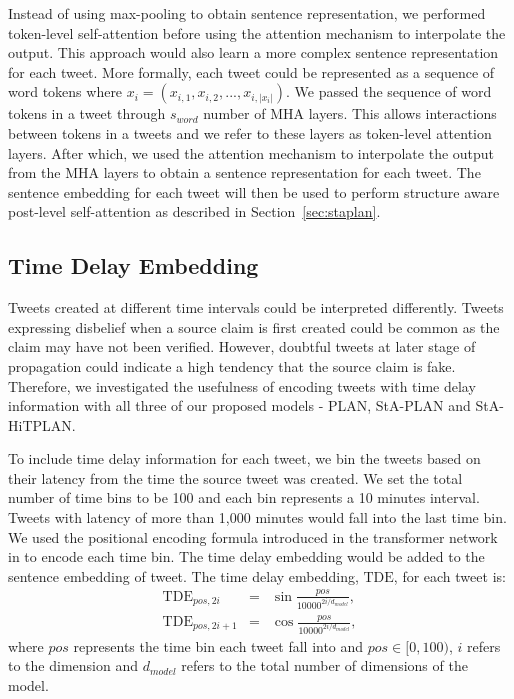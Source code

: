\documentclass[letterpaper]{article} %
\begin{document}
Instead of using max-pooling to obtain sentence representation, we performed token-level self-attention before using the attention mechanism to interpolate the output. This approach would also learn a more complex sentence representation for each tweet. More formally, each tweet could be represented as a sequence of word tokens where  $x_{i} = (x_{i,1}, x_{i,2}, ..., x_{i,|x_i|})$. We passed the sequence of word tokens in a tweet through $s_{word}$ number of MHA layers. This allows interactions between tokens in a tweets and we refer to these layers as token-level attention layers. After which, we used the attention mechanism to interpolate the output from the MHA layers to obtain a sentence representation for each tweet. The sentence embedding for each tweet will then be used to perform structure aware post-level self-attention as described in Section~\ref{sec:staplan}.

\subsection{Time Delay Embedding}
\label{sec:timedelay}
Tweets created at different time intervals could be interpreted differently. Tweets expressing disbelief when a source claim is first created could be common as the claim may have not been verified. However, doubtful tweets at later stage of propagation could indicate a high tendency that the source claim is fake. Therefore, we investigated the usefulness of encoding tweets with time delay information with all three of our proposed models - PLAN, StA-PLAN and StA-HiTPLAN.

To include time delay information for each tweet, we bin the tweets based on their latency from the time the source tweet was created. We set the total number of time bins to be 100 and each bin represents a 10 minutes interval. Tweets with latency of more than 1,000 minutes would fall into the last time bin.
We used the positional encoding formula introduced in the transformer network in \citet{DBLP:journals/corr/VaswaniSPUJGKP17} to encode each time bin. The time delay embedding would be added to the sentence embedding of tweet. The time delay embedding, $\mathrm{TDE}$, for each tweet is: 
\begin{eqnarray}
\mathrm{TDE}_{pos,2i} &=& \sin \frac{pos}{10000^{2i/d_{model}}}, \\ 
\mathrm{TDE}_{pos,2i+1} &=& \cos \frac{pos}{10000^{2i/d_{model}}},
\end{eqnarray}
where $pos$ represents the time bin each tweet fall into and $pos \in [0,100)$, $i$ refers to the dimension and $d_{model}$ refers to the total number of dimensions of the model. 
\newcommand{\tabitem}{~~\llap{\textbullet}~~}
\end{document}
